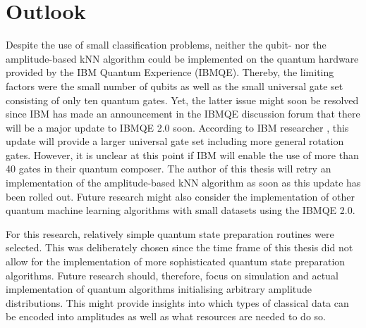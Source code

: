 


\chapter{Outlook}\label{sec:outlook}

Despite the use of small classification problems, neither the qubit- nor the amplitude-based kNN algorithm could be implemented on the quantum hardware provided by the IBM Quantum Experience (IBMQE). Thereby, the limiting factors were the small number of qubits as well as the small universal gate set consisting of only ten quantum gates. Yet, the latter issue might soon be resolved since IBM has made an announcement in the IBMQE discussion forum that there will be a major update to IBMQE 2.0 soon. According to IBM researcher , this update will provide a larger universal gate set including more general rotation gates. However, it is unclear at this point if IBM will enable the use of more than 40 gates in their quantum composer. The author of this thesis will retry an implementation of the amplitude-based kNN algorithm as soon as this update has been rolled out. Future research might also consider the implementation of other quantum machine learning algorithms with small datasets using the IBMQE 2.0.

For this research, relatively simple quantum state preparation routines were selected. This was deliberately chosen since the time frame of this thesis did not allow for the implementation of more sophisticated quantum state preparation algorithms. Future research should, therefore, focus on simulation and actual implementation of quantum algorithms initialising arbitrary amplitude distributions. This might provide insights into which types of classical data can be encoded into amplitudes as well as what resources are needed to do so.


